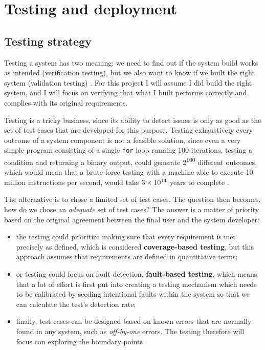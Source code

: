 \chapter{Testing and deployment}

\section{Testing strategy}
Testing a system has two meaning: we need to find out if the system build works
as intended (verification testing), but we also want to know if we built the
right system (validation testing) \cite{VV08}. For this project I will assume
I did build the right system, and I will focus on verifying that what I built
performs correctly and complies with its original requirements.

Testing is a tricky business, since its ability to detect issues is only as
good as the set of test cases that are developed for this purpose. Testing
exhaustively every outcome of a system component is not a feasible solution,
since even a very simple program consisting of a single \texttt{for} loop
running 100 iterations, testing a condition and returning a binary output, could
generate 2\textsuperscript{100} different outcomes, which would mean that a
brute-force testing with a machine able to execute 10 million instructions per
second, would take $3 \times 10\textsuperscript{14}$ years to complete
\cite{VV08}.

The alternative is to chose a limited set of test cases. The question then
becomes, how do we chose an \emph{adequate} set of test cases? The answer is a
matter of priority based on the original agreement between the final user and the
system developer:
\begin{itemize}
  \item the testing could prioritize making sure that every requirement is met
  precisely as defined, which is considered \textbf{coverage-based testing}, but
  this approach assumes that requirements are defined in quantitative terms;
  \item or testing could focus on fault detection, \textbf{fault-based testing},
  which means that a lot of effort is first put into creating a testing
  mechanism which needs to be calibrated by seeding intentional faults within
  the system so that we can calculate the test's detection rate;
  \item finally, test cases can be designed based on known errors
  that are normally found in any system, such as \emph{off-by-one} errors. The
  testing therefore will focus con exploring the boundary points \cite{VV08}.
\end{itemize}

